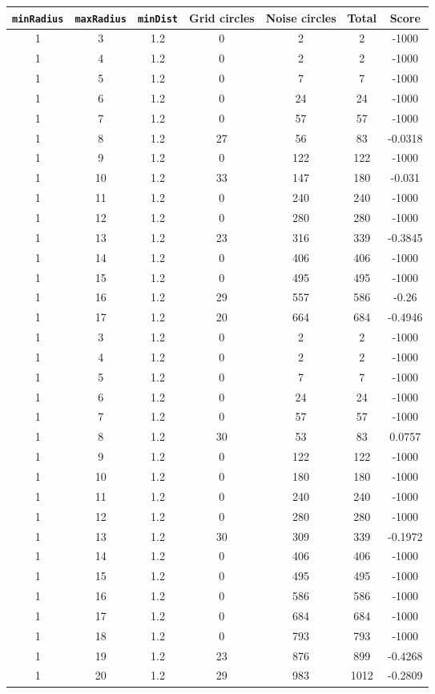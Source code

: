 \documentclass[letterpaper, 12pt]{article}
\begin{document}
\begin{longtable}{|c|c|c|c|c|c|c|}
\hline
\textbf{\texttt{minRadius}} & \textbf{\texttt{maxRadius}} & \textbf{\texttt{minDist}} & \textbf{Grid circles} & \textbf{Noise circles} & \textbf{Total} & \textbf{Score} \\
\hline
1 & 3 & 1.2 & 0 & 2 & 2 & -1000 \\
\hline
1 & 4 & 1.2 & 0 & 2 & 2 & -1000 \\
\hline
1 & 5 & 1.2 & 0 & 7 & 7 & -1000 \\
\hline
1 & 6 & 1.2 & 0 & 24 & 24 & -1000 \\
\hline
1 & 7 & 1.2 & 0 & 57 & 57 & -1000 \\
\hline
1 & 8 & 1.2 & 27 & 56 & 83 & -0.0318 \\
\hline
1 & 9 & 1.2 & 0 & 122 & 122 & -1000 \\
\hline
1 & 10 & 1.2 & 33 & 147 & 180 & -0.031 \\
\hline
1 & 11 & 1.2 & 0 & 240 & 240 & -1000 \\
\hline
1 & 12 & 1.2 & 0 & 280 & 280 & -1000 \\
\hline
1 & 13 & 1.2 & 23 & 316 & 339 & -0.3845 \\
\hline
1 & 14 & 1.2 & 0 & 406 & 406 & -1000 \\
\hline
1 & 15 & 1.2 & 0 & 495 & 495 & -1000 \\
\hline
1 & 16 & 1.2 & 29 & 557 & 586 & -0.26 \\
\hline
1 & 17 & 1.2 & 20 & 664 & 684 & -0.4946 \\
\hline
1 & 3 & 1.2 & 0 & 2 & 2 & -1000 \\
\hline
1 & 4 & 1.2 & 0 & 2 & 2 & -1000 \\
\hline
1 & 5 & 1.2 & 0 & 7 & 7 & -1000 \\
\hline
1 & 6 & 1.2 & 0 & 24 & 24 & -1000 \\
\hline
1 & 7 & 1.2 & 0 & 57 & 57 & -1000 \\
\hline
1 & 8 & 1.2 & 30 & 53 & 83 & 0.0757 \\
\hline
1 & 9 & 1.2 & 0 & 122 & 122 & -1000 \\
\hline
1 & 10 & 1.2 & 0 & 180 & 180 & -1000 \\
\hline
1 & 11 & 1.2 & 0 & 240 & 240 & -1000 \\
\hline
1 & 12 & 1.2 & 0 & 280 & 280 & -1000 \\
\hline
1 & 13 & 1.2 & 30 & 309 & 339 & -0.1972 \\
\hline
1 & 14 & 1.2 & 0 & 406 & 406 & -1000 \\
\hline
1 & 15 & 1.2 & 0 & 495 & 495 & -1000 \\
\hline
1 & 16 & 1.2 & 0 & 586 & 586 & -1000 \\
\hline
1 & 17 & 1.2 & 0 & 684 & 684 & -1000 \\
\hline
1 & 18 & 1.2 & 0 & 793 & 793 & -1000 \\
\hline
1 & 19 & 1.2 & 23 & 876 & 899 & -0.4268 \\
\hline
1 & 20 & 1.2 & 29 & 983 & 1012 & -0.2809 \\
\hline
\end{longtable}
\end{document}
